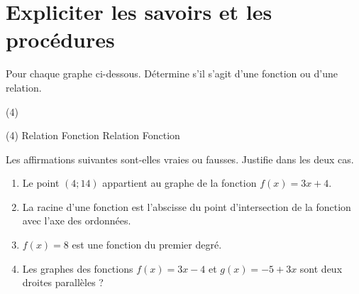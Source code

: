 \documentclass[a4paper, 12pt, parskip=half-]{scrartcl}
\begin{document}
\section*{ Expliciter les savoirs et les procédures}
\begin{connaitre}[points=1]
    Pour chaque graphe ci-dessous. Détermine s'il s'agit d'une fonction ou d'une relation.
    \begin{tasks}(4)
        \task 
        \task 
        \task 
        \task 
    \end{tasks}
\end{connaitre}
\begin{solconnaitre}
    \begin{tasks}(4)
        \task Relation
        \task Fonction
        \task Relation
        \task Fonction
    \end{tasks}
\end{solconnaitre}
\begin{connaitre}[points=4]
    Les affirmations suivantes sont-elles vraies ou fausses. Justifie dans les deux cas.
    \begin{enumerate}
        \item Le point $(4;14)$ appartient au graphe de la fonction $f(x)=3x+4$.
        \item La racine d'une fonction est l'abscisse du point d'intersection de la fonction avec l'axe des ordonnées.
        \item $f(x) = 8$ est une fonction du premier degré.
        \item Les graphes des fonctions $f(x) = 3x - 4$ et $g(x) = -5 + 3x$ sont deux droites parallèles ?
    \end{enumerate}
\end{connaitre}
\end{document}

